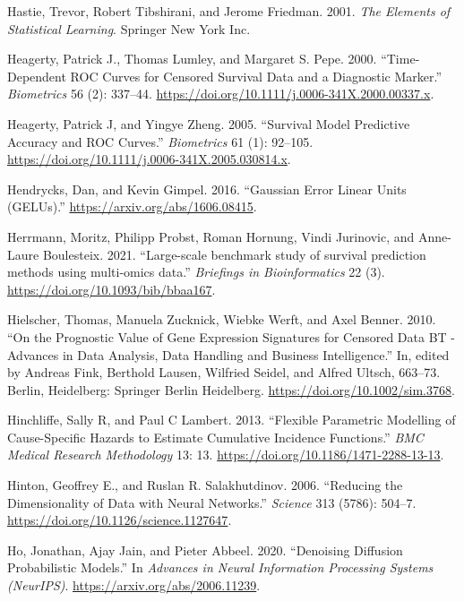 \documentclass[
  letterpaper,
  krantz2]{style/krantz}
\newlength{\cslhangindent}
\newenvironment{CSLReferences}[2] %
 {\begin{list}{}{%
  \setlength{\itemindent}{0pt}
  \setlength{\leftmargin}{0pt}
  \setlength{\parsep}{0pt}
  \ifodd #1
   \setlength{\leftmargin}{\cslhangindent}
   \setlength{\itemindent}{-1\cslhangindent}
  \fi
  \setlength{\itemsep}{#2\baselineskip}}}
 {\end{list}}
\begin{document}
\begin{CSLReferences}{1}{0}
Hastie, Trevor, Robert Tibshirani, and Jerome Friedman. 2001. \emph{{The
Elements of Statistical Learning}}. Springer New York Inc.

Heagerty, Patrick J., Thomas Lumley, and Margaret S. Pepe. 2000.
{``{Time-Dependent ROC Curves for Censored Survival Data and a
Diagnostic Marker}.''} \emph{Biometrics} 56 (2): 337--44.
\url{https://doi.org/10.1111/j.0006-341X.2000.00337.x}.

Heagerty, Patrick J, and Yingye Zheng. 2005. {``{Survival Model
Predictive Accuracy and ROC Curves}.''} \emph{Biometrics} 61 (1):
92--105. \url{https://doi.org/10.1111/j.0006-341X.2005.030814.x}.

Hendrycks, Dan, and Kevin Gimpel. 2016. {``{Gaussian Error Linear Units
(GELUs)}.''} \url{https://arxiv.org/abs/1606.08415}.

Herrmann, Moritz, Philipp Probst, Roman Hornung, Vindi Jurinovic, and
Anne-Laure Boulesteix. 2021. {``{Large-scale benchmark study of survival
prediction methods using multi-omics data}.''} \emph{Briefings in
Bioinformatics} 22 (3). \url{https://doi.org/10.1093/bib/bbaa167}.

Hielscher, Thomas, Manuela Zucknick, Wiebke Werft, and Axel Benner.
2010. {``{On the Prognostic Value of Gene Expression Signatures for
Censored Data BT - Advances in Data Analysis, Data Handling and Business
Intelligence}.''} In, edited by Andreas Fink, Berthold Lausen, Wilfried
Seidel, and Alfred Ultsch, 663--73. Berlin, Heidelberg: Springer Berlin
Heidelberg. \url{https://doi.org/10.1002/sim.3768}.

Hinchliffe, Sally R, and Paul C Lambert. 2013. {``Flexible Parametric
Modelling of Cause-Specific Hazards to Estimate Cumulative Incidence
Functions.''} \emph{BMC Medical Research Methodology} 13: 13.
\url{https://doi.org/10.1186/1471-2288-13-13}.

Hinton, Geoffrey E., and Ruslan R. Salakhutdinov. 2006. {``{Reducing the
Dimensionality of Data with Neural Networks}.''} \emph{Science} 313
(5786): 504--7. \url{https://doi.org/10.1126/science.1127647}.

Ho, Jonathan, Ajay Jain, and Pieter Abbeel. 2020. {``{Denoising
Diffusion Probabilistic Models}.''} In \emph{Advances in Neural
Information Processing Systems (NeurIPS)}.
\url{https://arxiv.org/abs/2006.11239}.


\end{CSLReferences}
\end{document}
